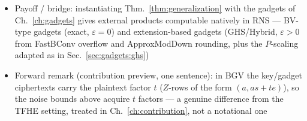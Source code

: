 \begin{itemize}
    \item Payoff / bridge: instantiating Thm.~\ref{thm:generalization} with
          the gadgets of Ch.~\ref{ch:gadgets} gives external products
          computable natively in RNS --- BV-type gadgets (exact,
          $\varepsilon = 0$) and extension-based gadgets (GHS/Hybrid,
          $\varepsilon > 0$ from FastBConv overflow and ApproxModDown
          rounding, plus the $P$-scaling adapted as in
          Sec.~\ref{sec:gadgets:ghs})
    \item Forward remark (contribution preview, one sentence): in BGV the
          key/gadget ciphertexts carry the plaintext factor $t$
          ($Z$-rows of the form $(a, as + te)$), so the noise bounds above
          acquire $t$ factors --- a genuine difference from the TFHE setting,
          treated in Ch.~\ref{ch:contribution}, not a notational one
\end{itemize}

\newpage